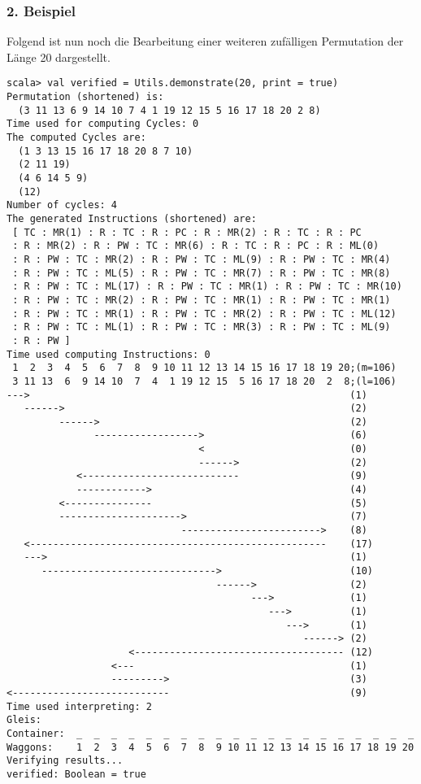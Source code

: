 \subsubsection*{2. Beispiel}
Folgend ist nun noch die Bearbeitung einer weiteren zufälligen Permutation der Länge 20 dargestellt.
\begin{lstlisting}
scala> val verified = Utils.demonstrate(20, print = true) 
Permutation (shortened) is:
  (3 11 13 6 9 14 10 7 4 1 19 12 15 5 16 17 18 20 2 8)
Time used for computing Cycles: 0
The computed Cycles are: 
  (1 3 13 15 16 17 18 20 8 7 10)
  (2 11 19)
  (4 6 14 5 9)
  (12)
Number of cycles: 4
The generated Instructions (shortened) are: 
 [ TC : MR(1) : R : TC : R : PC : R : MR(2) : R : TC : R : PC
 : R : MR(2) : R : PW : TC : MR(6) : R : TC : R : PC : R : ML(0)
 : R : PW : TC : MR(2) : R : PW : TC : ML(9) : R : PW : TC : MR(4)
 : R : PW : TC : ML(5) : R : PW : TC : MR(7) : R : PW : TC : MR(8)
 : R : PW : TC : ML(17) : R : PW : TC : MR(1) : R : PW : TC : MR(10)
 : R : PW : TC : MR(2) : R : PW : TC : MR(1) : R : PW : TC : MR(1)
 : R : PW : TC : MR(1) : R : PW : TC : MR(2) : R : PW : TC : ML(12)
 : R : PW : TC : ML(1) : R : PW : TC : MR(3) : R : PW : TC : ML(9)
 : R : PW ] 
Time used computing Instructions: 0
 1  2  3  4  5  6  7  8  9 10 11 12 13 14 15 16 17 18 19 20;(m=106)
 3 11 13  6  9 14 10  7  4  1 19 12 15  5 16 17 18 20  2  8;(l=106)
--->                                                       (1)
   ------>                                                 (2)
         ------>                                           (2)
               ------------------>                         (6)
                                 <                         (0)
                                 ------>                   (2)
            <---------------------------                   (9)
            ------------>                                  (4)
         <---------------                                  (5)
         --------------------->                            (7)
                              ------------------------>    (8)
   <---------------------------------------------------    (17)
   --->                                                    (1)
      ------------------------------>                      (10)
                                    ------>                (2)
                                          --->             (1)
                                             --->          (1)
                                                --->       (1)
                                                   ------> (2)
                     <------------------------------------ (12)
                  <---                                     (1)
                  --------->                               (3)
<---------------------------                               (9)
Time used interpreting: 2
Gleis: 
Container:  _  _  _  _  _  _  _  _  _  _  _  _  _  _  _  _  _  _  _  _
Waggons:    1  2  3  4  5  6  7  8  9 10 11 12 13 14 15 16 17 18 19 20
Verifying results...
verified: Boolean = true
\end{lstlisting}
